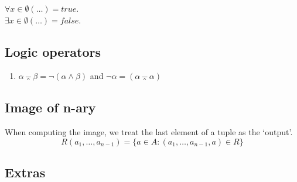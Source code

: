 \documentclass[twocolumn,a4paper]{article}
\newcommand{\image}[1]{
\begin{figure}[ht]
	\centering
	\fbox{\resizebox{1\columnwidth}{!}{\texttt{[image: \#1]}}}
\end{figure}
}
\begin{document}
\(\forall x\in\emptyset(\ldots) = true\). \\
\(\exists x\in\emptyset(\ldots) = false\).

\subsection*{Logic operators}
\begin{enumerate}
	\item $\alpha \barwedge \beta = \neg (\alpha \wedge \beta)$ and $\neg \alpha = (\alpha \barwedge \alpha)$
\end{enumerate}

\subsection*{Image of n-ary}
When computing the image, we treat the last element of a tuple as the `output'.
\begin{equation}
	R(a_1, \ldots, a_{n-1}) = \{a \in A : (a_1, \ldots, a_{n-1}, a) \in R \}
\end{equation}

\newpage
\subsection*{Extras}

\image{2017_1/2017a/uppg3.png}
\image{2017_1/2017a/uppg5.png}
\image{2017_1/2017a/uppg4.png}
\image{misc/2018-2-2.png}
\image{misc/vertecies-uppg.png}
\image{misc/languages.png}
\image{misc/5-1.png}
\end{document}
